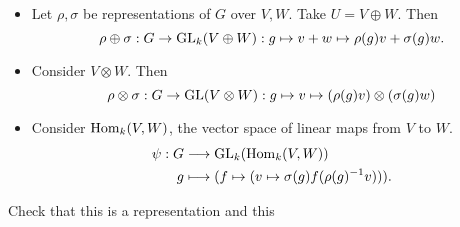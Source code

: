 \begin{itemize}
    \item Let $\rho, \sigma$ be representations of  $G$ over $V, W$.
        Take $U = V \oplus W$.
        Then \[\rho \oplus \sigma: G \to  \operatorname{GL}_k(V \oplus W) : g\mapsto v + w \mapsto  \rho(g) v + \sigma(g) w.\]
    \item Consider $V \otimes W$.
        Then  \[\rho\otimes \sigma: G \to  \operatorname{GL}(V \otimes W): g \mapsto v \mapsto (\rho(g) v) \otimes (\sigma(g) w)\]
    \item Consider $\operatorname{Hom}_k(V, W)$, the vector space of linear maps from  $V$ to $W$.
        \begin{align*}
            \psi: G &\longrightarrow \operatorname{GL}_k(\operatorname{Hom}_k(V, W))\\
            g &\longmapsto (f \mapsto (v \mapsto \sigma(g) f( \rho(g)^{-1} v )))
        .\end{align*} 
\end{itemize}

\begin{ex}
    Check that this is a representation and this
\end{ex}


